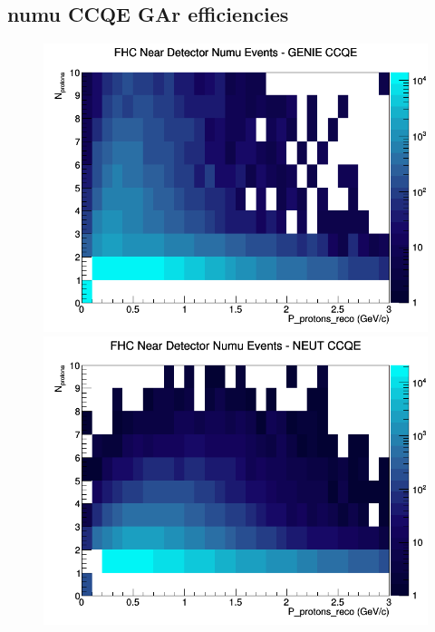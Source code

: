 \subsection{numu CCQE GAr efficiencies}
\begin{figure}[h]
\includegraphics[width=\linewidth]{eff_N_P/GAr/protons/CCQE_FHC_ND_numu_N_P_GENIE.png}
\endminipage
{}
\includegraphics[width=\linewidth]{eff_N_P/GAr/protons/CCQE_FHC_ND_numu_N_P_NEUT.png}
\endminipage
{}

\end{figure}
